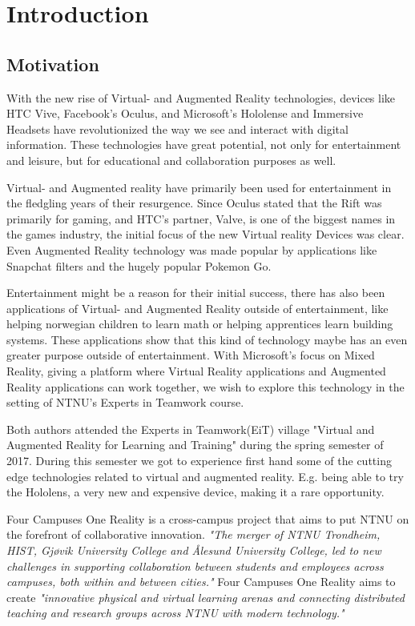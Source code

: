 \chapter{Introduction}
  
    \section{Motivation}
        With the new rise of Virtual- and Augmented Reality technologies, devices like HTC Vive, Facebook's Oculus, and Microsoft's Hololense and Immersive Headsets have revolutionized the way we see and interact with digital information. These technologies have great potential, not only for entertainment and leisure, but for educational and collaboration purposes as well.
    
        Virtual- and Augmented reality have primarily been used for entertainment in the fledgling years of their resurgence. Since Oculus stated that the Rift was primarily for gaming\cite{OculusMarkZuckerberg}, and HTC's partner, Valve, is one of the biggest names in the games industry\cite{ValveBigName}, the initial focus of the new Virtual reality Devices was clear. Even Augmented Reality technology was made popular by applications like Snapchat\cite{Snapchat} filters and the hugely popular Pokemon Go\cite{PokemonGo}.
        
        Entertainment might be a reason for their initial success, there has also been applications of Virtual- and Augmented Reality outside of entertainment, like helping norwegian children to learn math\cite{innomag2017} or helping apprentices learn building systems\cite{Nordbohus2017}. These applications show that this kind of technology maybe has an even greater purpose outside of entertainment. With Microsoft's focus on Mixed Reality, giving a platform where Virtual Reality applications and Augmented Reality applications can work together, we wish to explore this technology in the setting of NTNU's Experts in Teamwork
        course.
        
        Both authors attended the Experts in Teamwork(EiT) village "Virtual and Augmented Reality for Learning and Training" during the spring semester of 2017. During this semester we got to experience first hand some of the cutting edge technologies related to virtual and augmented reality. E.g. being able to try the Hololens, a very new and expensive device, making it a rare opportunity.
        
        Four Campuses One Reality is a cross-campus project that aims to put NTNU on the forefront of collaborative innovation. \emph{"The merger of NTNU Trondheim, HIST, Gjøvik University College and Ålesund University College, led to new challenges in supporting collaboration between students and employees across campuses, both within and between cities."} \cite{4C1R-Pitch} Four Campuses One Reality aims to create \emph{"innovative physical and virtual learning arenas and connecting distributed teaching and research groups across NTNU with modern technology."} \cite{4C1R-Pitch} 
                

